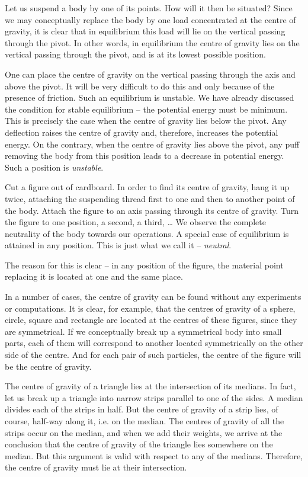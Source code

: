 Let us suspend a body by one of its points. How will it then be situated? Since we may conceptually replace the body by one load concentrated at the centre of gravity, it is clear that in equilibrium this load will lie on the vertical passing through the pivot. In other words, in equilibrium the centre of gravity lies on the vertical passing through the pivot, and is at its lowest possible position.


One can place the centre of gravity on the vertical passing through the axis and above the pivot. It will be very difficult to do this and only because of the presence of friction. Such an equilibrium is unstable. We have already discussed the condition for stable equilibrium -- the potential energy must be minimum. This is precisely the case when the centre of gravity lies below the pivot. Any deflection raises the centre of gravity and, therefore, increases the potential energy. On the contrary, when the centre of gravity lies above the pivot, any puff removing the body from this position leads to a decrease in potential energy. Such a position is \emph{unstable}.

Cut a figure out of cardboard. In order to find its centre of gravity, hang it up twice, attaching the suspending thread first to one and then to another point of the body. Attach the figure to an axis passing through its centre of gravity. Turn the figure to one position, a second, a third, \ldots{} We observe the complete neutrality of the body towards our operations. A special case of equilibrium is attained in any position. This is just what we call it -- \emph{neutral}.

The reason for this is clear -- in any position of the figure, the material point replacing it is located at one and the same place.

In a number of cases, the centre of gravity can be found without any experiments or computations. It is clear, for example, that the centres of gravity of a sphere, circle, square and rectangle are located at the centres of these figures, since they are symmetrical. If we conceptually break up a symmetrical body into small parts, each of them will correspond to another located symmetrically on the other side of the centre. And for each pair of such particles, the centre of the figure will be the centre of gravity.

The centre of gravity of a triangle lies at the intersection of its medians. In fact, let us break up a triangle into narrow strips parallel to one of the sides. A median divides each of the strips in half. But the centre of gravity of a strip lies, of course, half-way along it, i.e. on the median. The centres of gravity of all the strips occur on the median, and when we add their weights, we arrive at the
conclusion that the centre of gravity of the triangle lies somewhere on the median. But this argument is valid with respect to any of the medians. Therefore, the centre of gravity must lie at their intersection.

